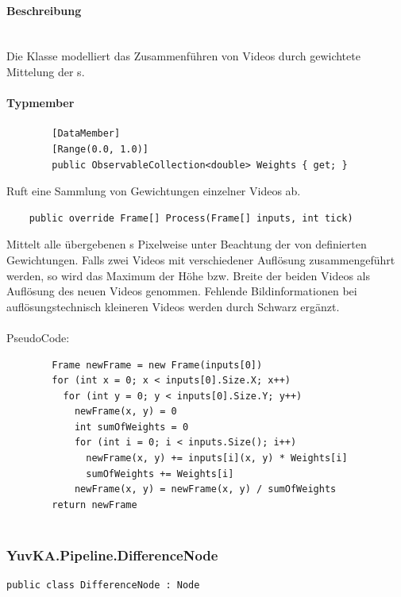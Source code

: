 \paragraph{Beschreibung}~\\
Die Klasse  modelliert das Zusammenführen von Videos durch gewichtete Mittelung der s.

\paragraph{Typmember}
\begin{itemize}

	\begin{verbatim}
		[DataMember]
		[Range(0.0, 1.0)]
		public ObservableCollection<double> Weights { get; }
	\end{verbatim}
	Ruft eine Sammlung von Gewichtungen einzelner Videos ab.

	\begin{verbatim}
	public override Frame[] Process(Frame[] inputs, int tick)
	\end{verbatim}
	Mittelt alle übergebenen s Pixelweise unter Beachtung der von  definierten Gewichtungen. Falls zwei Videos mit verschiedener Auflösung zusammengeführt werden, so wird das Maximum der Höhe bzw. Breite der beiden Videos als Auflösung des neuen Videos genommen. Fehlende Bildinformationen bei auflösungstechnisch kleineren Videos werden durch Schwarz ergänzt.\\~\\
	PseudoCode:
	\begin{verbatim}
		Frame newFrame = new Frame(inputs[0])
		for (int x = 0; x < inputs[0].Size.X; x++)
		  for (int y = 0; y < inputs[0].Size.Y; y++)
		    newFrame(x, y) = 0
		    int sumOfWeights = 0
		    for (int i = 0; i < inputs.Size(); i++)
		      newFrame(x, y) += inputs[i](x, y) * Weights[i]
		      sumOfWeights += Weights[i]
		    newFrame(x, y) = newFrame(x, y) / sumOfWeights
		return newFrame
		
	\end{verbatim}
	
\end{itemize}

\subsubsection{YuvKA.Pipeline.DifferenceNode}

\begin{verbatim}
public class DifferenceNode : Node
\end{verbatim}

